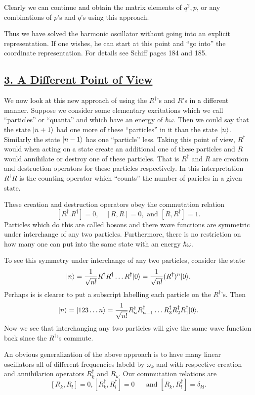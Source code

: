 Clearly we can continue and obtain the matrix elements of $q^2, p$, or any combinations of $p$'s and $q$'s using this approach.

Thus we have solved the harmonic oscillator without going into an explicit representation. If one wishes, he can start at this point and ``go into'' the coordinate representation. For details
see Schiff pages 184 and 185. 

\subsection{\underline{3. A Different Point of View}}
We now look at this new approach of using the $R^\dagger$'s and $R$'s in a different manner. Suppose we consider some elementary excitations which we call ``particles'' or ``quanta'' and 
which have an energy of $\hbar\omega$. Then we could say that the state $|n+1\rangle$ had one more of these ``particles'' in it than the state $|n\rangle$. Similarly the state $|n-1\rangle$ has one 
``particle'' less. Taking this point of view, $R^\dagger$ would when acting on a state create an additional one of these particles and $R$ would annihilate or destroy one of these particles. 
That is $R^\dagger$ and $R$ are creation and destruction operators for these particles respectively. In this interpretation $R^\dagger R$ is the counting operator which ``counts'' the number of 
paricles in a given state. 

These creation and destruction operators obey the commutation relation 
$$[R^\dagger. R^\dagger] = 0, \quad [R,R] = 0,\mbox{   and } [R,R^\dagger] = 1.$$
Particles which do this are called bosons and there wave functions are symmetric under interchange of any two particles. Furthermore, there is no restriction on how many one can
put into the same state with an energy $\hbar\omega$. 

To see this symmetry under interchange of any two particles, consider the state 
$$|n\rangle = {1\over\sqrt{n!}}R^\dagger R^\dagger \hdots R^\dagger|0\rangle = {1\over\sqrt{n!}}(R^\dagger)^n|0\rangle.$$
Perhaps is is clearer to put a subscript labelling each particle on the $R^\dagger$'s. Then 
$$|n\rangle = |1 2 3 \hdots n\rangle = {1\over\sqrt{n!}}R_n^\dagger R_{n-1}^\dagger\hdots R_3^\dagger R_2^\dagger R_1^\dagger |0\rangle.$$
Now we see that interchanging any two particles will give the same wave function back since the $R^\dagger$'s commute. 

An obvious generalization of the above approach is to have many linear oscillators all of different frequencies labeld by $\omega_k$ and with respective creation and annihilarion operators $R_k^\dagger$ and $R_k$.
Our commutation relations are 
$$[R_k, R_l] = 0, [R_k^\dagger, R_l^\dagger] = 0 \mbox{  ~~~ and  } [R_k, R_l^\dagger] = \delta_{kl}.$$

